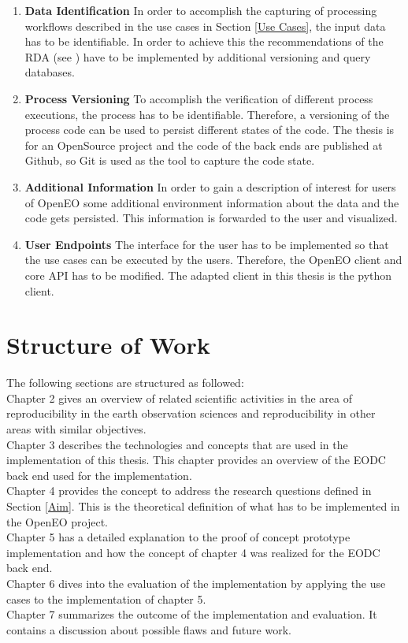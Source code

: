\documentclass[draft,final]{vutinfth} %
\begin{document}
\begin{enumerate}
	\item \textbf{Data Identification}
	In order to accomplish the capturing of processing workflows described in the use cases in Section \ref{Use Cases}, the input data has to be identifiable. In order to achieve this the recommendations of the RDA (see \cite{Rauber2016IdentificationOR}) have to be implemented by additional versioning and query databases. 
	
	\item \textbf{Process Versioning}
	To accomplish the verification of different process executions, the process has to be identifiable. Therefore, a versioning of the process code can be used to persist different states of the code. The thesis is for an OpenSource project and the code of the back ends are published at Github, so Git is used as the tool to capture the code state. 
	
	\item \textbf{Additional Information}
	In order to gain a description of interest for users of OpenEO some additional environment information about the data and the code gets persisted. This information is forwarded to the user and visualized.   
	
	\item \textbf{User Endpoints}
	The interface for the user has to be implemented so that the use cases can be executed by the users. Therefore, the OpenEO client and core API has to be modified. The adapted client in this thesis is the python client. 
\end{enumerate}

\section{Structure of Work}\label{Structure}
The following sections are structured as followed:\\
Chapter 2 gives an overview of related scientific activities in the area of reproducibility in the earth observation sciences and reproducibility in other areas with similar objectives.\\
Chapter 3  describes the technologies and concepts that are used in the implementation of this thesis. This chapter provides an overview of the EODC back end used for the implementation.\\
Chapter 4 provides the concept to address the research questions defined in Section \ref{Aim}.  This is the theoretical definition of what has to be implemented in the OpenEO project.\\
Chapter 5 has a detailed explanation to the proof of concept prototype implementation and how the concept of chapter 4 was realized for the EODC back end. \\
Chapter 6 dives into the evaluation of the implementation by applying the use cases to the implementation of chapter 5.\\
Chapter 7 summarizes the outcome of the implementation and evaluation. It contains a discussion about possible flaws and future work. \\
\end{document}
